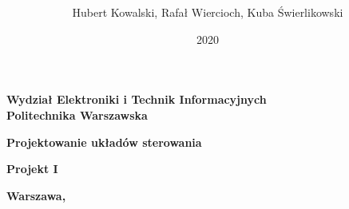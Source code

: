 \documentclass[a4paper,titlepage,11pt,twosides,floatssmall]{mwrep}
\begin{document}
\frenchspacing
\pagestyle{plain} %

\title{\bf\vskip 0.1cm}
\author{Hubert Kowalski, Rafał Wiercioch, Kuba Świerlikowski}
\date{2020}

\makeatletter
\renewcommand{\maketitle}{\begin{titlepage}
\begin{center}{\LARGE {\bf
Wydział Elektroniki i Technik Informacyjnych}}\\
\vspace{0.4cm}
{\LARGE {\bf Politechnika Warszawska}}\\
\vspace{0.3cm}
\end{center}
\vspace{5cm}
\begin{center}
{\bf \LARGE Projektowanie układów sterowania \vskip 0.1cm}
\end{center}
\vspace{1cm}
\begin{center}
{\bf \LARGE Projekt I \vskip 0.1cm}
\end{center}
\vspace{1cm}
\begin{center}
{\bf \LARGE \@title}
\end{center}
\vspace{2cm}
\begin{center}
{\bf \Large \@author \par}
\end{center}
\vspace*{\stretch{6}}
\begin{center}
\bf{\large{Warszawa, \@date\vskip 0.1cm}}
\end{center}
\end{titlepage}
}


\maketitle
\tableofcontents

\end{document}
